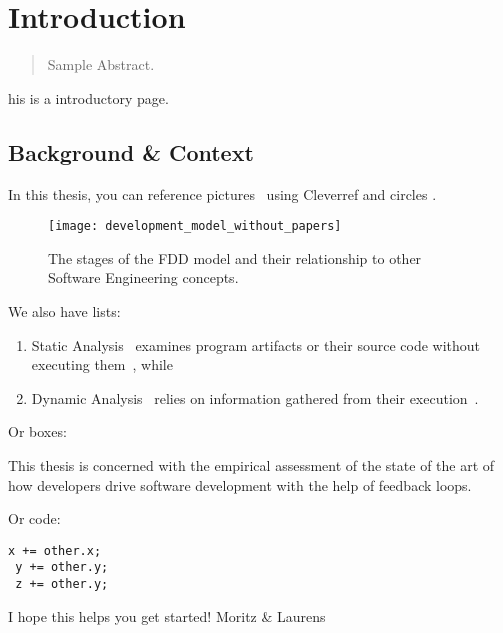 \chapter{Introduction}
\label{introduction}

\begin{abstract}
Sample Abstract.
\end{abstract}



\newpage

his is a introductory page.

\section{Background \& Context}
In this thesis, you can reference pictures~ using Cleverref and circles .

\begin{figure}[htb]
	\centering
	\texttt{[image: development\_model\_without\_papers]}
	\caption{The stages of the FDD model and their relationship to other
          Software Engineering concepts.}
	\label{fig:devmodel}
\end{figure}

We also have lists:

\begin{enumerate}
  \item Static Analysis~ examines program artifacts or
    their source code without executing them~\cite{wichmann1995industrial}, while
 \item Dynamic Analysis~ relies on information gathered from their
   execution~\cite{cornelissen2009systematic}.
\end{enumerate}

Or boxes:

\begin{framed}
This thesis is concerned with the empirical assessment of the state of the art of how developers
drive software development with the help of feedback loops.
\end{framed}

Or code:
\begin{lstlisting}[caption={\textsc{TrinityCore}},label={lst:e1}]
 x += other.x;
 y += other.y;
 z += other.y;
\end{lstlisting}


I hope this helps you get started!
Moritz \& Laurens
